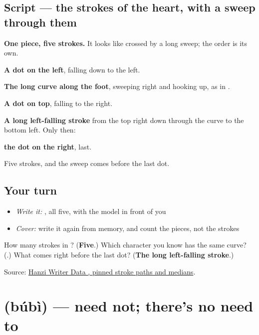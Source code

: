 \subsection*{Script — the strokes of the heart, with a sweep through them}

\begin{quote}
\end{quote}

\textbf{One piece, five strokes.} It looks like  crossed by a long sweep; the order is its own.

\textbf{A dot on the left}, falling down to the left.

\textbf{The long curve along the foot}, sweeping right and hooking up, as in .

\textbf{A dot on top}, falling to the right.

\textbf{A long left-falling stroke} from the top right down through the curve to the bottom left. Only then:

\textbf{the dot on the right}, last.

Five strokes, and the sweep comes before the last dot.

\subsection*{Your turn}
\begin{itemize}
\raggedright
  \item \emph{Write it:} , all five, with the model in front of you
  \item \emph{Cover:} write it again from memory, and count the pieces, not the strokes
\end{itemize}

\begin{tcolorbox}[breakable,colback=teal!4,colframe=teal!35!black,title={Before you move on}]
How many strokes in ? (\textbf{Five}.) Which character you know has the same curve? (\textbf{}.) What comes right before the last dot? (\textbf{The long left-falling stroke}.)

Source: \href{https://raw.githubusercontent.com/chanind/hanzi-writer-data/68d10a4b21150cae5e1ebbd223eed289cf32d90c/data/\%E5\%BF\%85.json}{Hanzi Writer Data , pinned stroke paths and medians}.
\end{tcolorbox}
\section[\texorpdfstring{\zh{不必} (búbì)}{不必 (búbì)}]{ (búbì) — need not; there's no need to}

